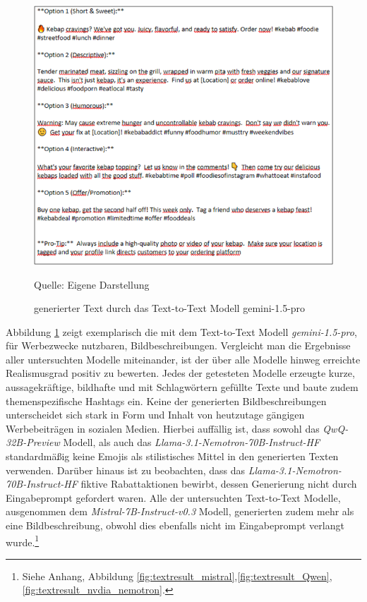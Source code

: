 \clearpage
\begin{figure}[htbp]
    \includegraphics[width=\textwidth, height=\textheight, keepaspectratio]{abbildungen/textresult_gemini}
    \caption{generierter Text durch das Text-to-Text Modell gemini-1.5-pro}
    \label{fig:textresult_gemini}
    \raggedright Quelle: Eigene Darstellung
\end{figure}
Abbildung \ref{fig:textresult_gemini} zeigt exemplarisch die mit dem Text-to-Text Modell \textit{gemini-1.5-pro}, für Werbezwecke nutzbaren, Bildbeschreibungen.
Vergleicht man die Ergebnisse aller untersuchten Modelle miteinander, ist der über alle Modelle hinweg erreichte Realismusgrad positiv zu bewerten.
Jedes der getesteten Modelle erzeugte kurze, aussagekräftige, bildhafte und mit Schlagwörtern gefüllte Texte und baute zudem themenspezifische Hashtags ein.
Keine der generierten Bildbeschreibungen unterscheidet sich stark in Form und Inhalt von heutzutage gängigen Werbebeiträgen in sozialen Medien.
Hierbei auffällig ist, dass sowohl das \textit{QwQ-32B-Preview} Modell, als auch das \textit{Llama-3.1-Nemotron-70B-Instruct-HF} standardmäßig keine Emojis als stilistisches Mittel in den generierten Texten verwenden.
Darüber hinaus ist zu beobachten, dass das \textit{Llama-3.1-Nemotron-70B-Instruct-HF} fiktive Rabattaktionen bewirbt, dessen Generierung nicht durch Eingabeprompt gefordert waren.
Alle der untersuchten Text-to-Text Modelle, ausgenommen dem \textit{Mistral-7B-Instruct-v0.3} Modell, generierten zudem mehr als eine Bildbeschreibung, obwohl dies ebenfalls nicht im Eingabeprompt verlangt wurde.\footnote{Siehe Anhang, Abbildung \ref{fig:textresult_mistral},\ref{fig:textresult_Qwen},\ref{fig:textresult_nvdia_nemotron}.}

